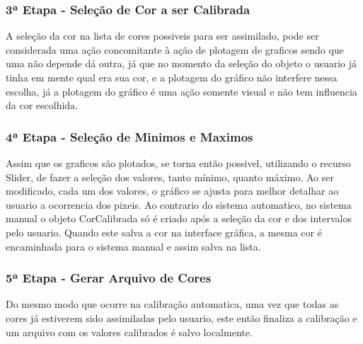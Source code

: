   	\subsubsection{3ª Etapa - Seleção de Cor a ser Calibrada}
  	A seleção da cor na lista de cores possiveis para ser assimilado, pode ser considerada uma ação concomitante à ação de plotagem de graficos sendo que uma não depende dá outra, já que no momento da seleção do objeto o usuario já tinha em mente qual era sua cor, e a plotagem do gráfico não interfere nessa escolha, já a plotagem do gráfico é uma ação somente visual e não tem influencia da cor escolhida.
  	
  	\subsubsection{4ª Etapa - Seleção de Minimos e Maximos}
  	 Assim que os graficos são plotados, se torna então possivel, utilizando o recurso Slider, de fazer a seleção dos valores, tanto mínimo, quanto máximo. Ao ser modificado, cada um dos valores, o gráfico se ajusta para melhor detalhar ao usuario a ocorrencia dos pixeis. Ao contrario do sistema automatico, no sistema manual o objeto CorCalibrada só é criado após a seleção da cor e dos intervalos pelo usuario. Quando este salva a cor na interface gráfica, a mesma cor é encaminhada para o sistema manual e assim salva na lista.
  	 
  	 
\subsubsection{5ª Etapa - Gerar Arquivo de Cores}
Do mesmo modo que ocorre na calibração automatica, uma vez que todas as cores já estiverem sido assimiladas pelo usuario, este então finaliza a calibração e um arquivo com os valores calibrados é salvo localmente.
  	   	
  		
  	